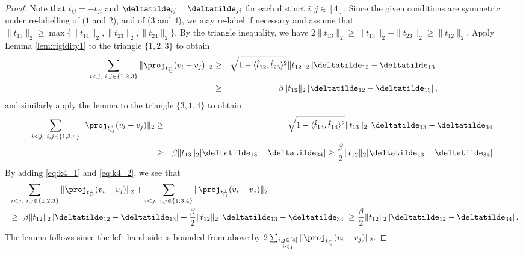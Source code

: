 \begin{proof}
Note that $t_{ij}=-t_{ji}$ and $\deltatilde_{ij}=\deltatilde_{ji}$ for each
distinct $i,j\in[4]$. Since the given conditions are symmetric under
re-labelling of ($1$ and $2$), and of ($3$ and $4$), we may re-label
if necessary and assume that $\|t_{13}\|_2 \ge\max\{\|t_{14}\|_2 ,\|t_{23}\|_2 ,\|t_{24}\|_2 \}$.
By the triangle inequality, we have $2\|t_{13}\|_2 \ge\|t_{13}\|_2 +\|t_{23}\|_2 \ge\|t_{12}\|_2 $.
Apply Lemma \ref{lem:rigidity1} to the triangle $\{1,2,3\}$ to obtain
\begin{eqnarray}
\sum_{i<j,\ i,j \in \{1, 2, 3\}}\|\proj_{t_{ij}^{\perp}}(v_{i}-v_{j})\|_2 & \ge & \sqrt{1-\langle \hat{t}_{12},\hat{t}_{23}\rangle^{2}}\|t_{12}\|_2 \left|\deltatilde_{12}-\deltatilde_{13}\right|\nonumber \\
 & \ge & \beta\|t_{12}\|_2 \left|\deltatilde_{12}-\deltatilde_{13}\right|,\label{eq:k4_1}
\end{eqnarray}
and similarly apply the lemma to the triangle $\{3,1,4\}$ to obtain
\begin{eqnarray}
\sum_{i<j, \ i,j\in\{1, 3, 4\}}\|\proj_{t_{ij}^{\perp}}(v_{i}-v_{j})\|_2 & \ge & \sqrt{1-\langle \hat{t}_{13},\hat{t}_{14}\rangle^{2}}\|t_{13}\|_2 \left|\deltatilde_{13}-\deltatilde_{34}\right|\nonumber \\
 & \ge & \beta\|t_{13}\|_2 |\deltatilde_{13}-\deltatilde_{34}|\ge\frac{\beta}{2}\|t_{12}\|_2 |\deltatilde_{13}-\deltatilde_{34}|.\label{eq:k4_2}
\end{eqnarray}
By adding \eqref{eq:k4_1} and \eqref{eq:k4_2}, we see that
\begin{align*}
	&\,\sum_{i<j,\ i,j \in \{1, 2, 3\}}\|\proj_{t_{ij}^{\perp}}(v_{i}-v_{j})\|_2
	+
	\sum_{i<j, \ i,j\in\{1, 3, 4\}}\|\proj_{t_{ij}^{\perp}}(v_{i}-v_{j})\|_2 \\
	&\,\ge \,\, 
	\beta\|t_{12}\|_2 \left|\deltatilde_{12}-\deltatilde_{13}\right|
	+
	\frac{\beta}{2}\|t_{12}\|_2 \left|\deltatilde_{13}-\deltatilde_{34}\right|
	\ge
	\frac{\beta}{2}\|t_{12}\|_2 \left|\deltatilde_{12}-\deltatilde_{34}\right|.
\end{align*}
The lemma follows since the left-hand-side is bounded from
above by $2 \sum_{\substack{i,j\in[4]\\i<j}} \|\proj_{t_{ij}^{\perp}}(v_{i}-v_{j})\|_2$.
\end{proof}







